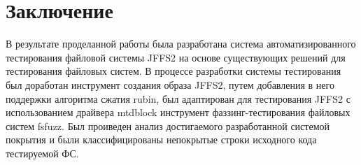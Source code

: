 \section{Заключение}
\label{sec:Chapter5} 

В результате проделанной работы была разработана система автоматизированного тестирования файловой системы JFFS2 на основе существующих решений для тестирования файловых систем. В процессе разработки системы тестирования был доработан инструмент создания образа JFFS2, путем добавления в него поддержки алгоритма сжатия rubin, был адаптирован для тестирования JFFS2 с использованием драйвера mtdblock инструмент фаззинг-тестирования файловых систем fsfuzz. Был проиведен анализ достигаемого разработанной системой покрытия и были классифицированы непокрытые строки исходного кода тестируемой ФС.

\newpage
